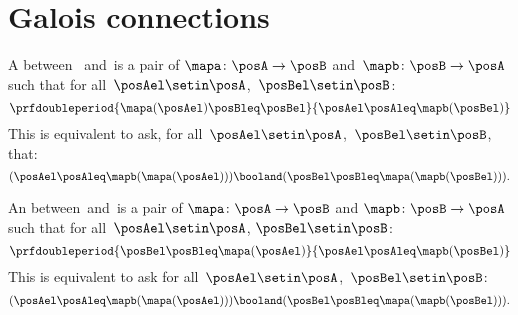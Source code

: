 {}

\section{Galois connections}\label{subsec:galois-connections}

\begin{ctdefinition}\label{def:monotone-galois-connection}
    A  between ~\posA and~\posB is a pair of 
    $\mapa\colon \posA\to \posB$ and~$\mapb\colon \posB\to \posA$ such that for all~$\posAel\setin \posA$,~$\posBel\setin \posB$:
    \begin{equation}
        \prfdoubleperiod{\mapa(\posAel) \posBleq \posBel}{\posAel \posAleq \mapb(\posBel)}
    \end{equation}
    This is equivalent to ask, for all~$\posAel\setin \posA$,~$\posBel\setin \posB$, that:
    \begin{equation}
        (\posAel\posAleq \mapb(\mapa(\posAel)))
        \booland (\posBel\posBleq \mapa(\mapb(\posBel))).
    \end{equation}
\end{ctdefinition}

\begin{ctdefinition}\label{def:antitone-galois-connection}
    An  between~\posA and~\posB is a pair of  $\mapa\colon \posA\to \posB$ and $\mapb \colon \posB\to \posA$ such that for all~$\posAel\setin \posA$, $\posBel\setin \posB$:
    \begin{equation}
        \prfdoubleperiod{\posBel \posBleq \mapa(\posAel)}{\posAel \posAleq \mapb(\posBel)}
    \end{equation}
    This is equivalent to ask for all~$\posAel\setin \posA$,~$\posBel\setin \posB$:
    \begin{equation}
        (\posAel \posAleq \mapb(\mapa(\posAel)))
        \booland (\posBel \posBleq \mapa(\mapb(\posBel))).
    \end{equation}
\end{ctdefinition}


